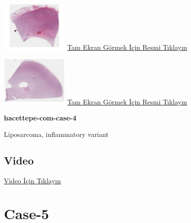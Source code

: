 \documentclass[
  letterpaper,
  DIV=11,
  numbers=noendperiod]{scrreprt}
\begin{document}
\href{https://images.patolojiatlasi.com/hacettepe-com-case-4/HE.html}{\includegraphics[width=0.25\textwidth,height=\textheight]{./screenshots/thumbnail_hacettepe-com-case-4-1.png}}
\href{https://images.patolojiatlasi.com/hacettepe-com-case-4/HE1.html}{Tam
Ekran Görmek İçin Resmi Tıklayın}

\href{https://images.patolojiatlasi.com/hacettepe-com-case-4/HE2.html}{\includegraphics[width=0.25\textwidth,height=\textheight]{./screenshots/thumbnail_hacettepe-com-case-4-2.png}}
\href{https://images.patolojiatlasi.com/hacettepe-com-case-4/HE2.html}{Tam
Ekran Görmek İçin Resmi Tıklayın}

\textbf{hacettepe-com-case-4}

\begin{tcolorbox}[enhanced jigsaw, colbacktitle=quarto-callout-tip-color!10!white, colback=white, titlerule=0mm, opacityback=0, colframe=quarto-callout-tip-color-frame, opacitybacktitle=0.6, bottomrule=.15mm, breakable, coltitle=black, title=\textcolor{quarto-callout-tip-color}{\faLightbulb}\hspace{0.5em}{Tanı}, toprule=.15mm, toptitle=1mm, bottomtitle=1mm, arc=.35mm, rightrule=.15mm, leftrule=.75mm, left=2mm]

Liposarcoma, inflammatory variant

\end{tcolorbox}

\hypertarget{video-2}{%
\subsection{Video}\label{video-2}}

\href{https://www.youtube.com/watch?v=Akp6H3myCIo}{Video İçin Tıklayın}

\hypertarget{sec-hacettepe-case-of-the-month-case-5}{%
\section{Case-5}\label{sec-hacettepe-case-of-the-month-case-5}}
\end{document}
